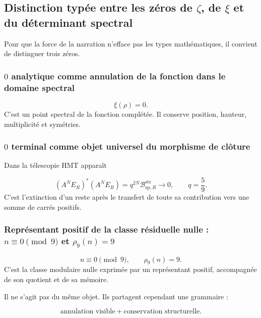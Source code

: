 \subsection{Distinction typée entre les zéros de \(\zeta\), de \(\xi\) et du déterminant spectral}
Pour que la force de la narration n'efface pas les types mathématiques, il convient de distinguer trois zéros.\par
{}
\subsubsection{\(0\) analytique comme annulation de la fonction dans le domaine spectral}
\[
\xi(\rho)=0.
\]
C'est un point spectral de la fonction complétée. Il conserve position, hauteur, multiplicité et symétries.\par
{}
\subsubsection{\(0\) terminal comme objet universel du morphisme de clôture}
Dans la télescopie HMT apparaît\par
\[
(A^NE_R)^*(A^NE_R)
=
q^{2N}
\mathcal B_{\mathrm{sp},R}^{\mathrm{str}}
\longrightarrow0,
\qquad
q=\frac59.
\]
C'est l'extinction d'un reste après le transfert de toute sa contribution vers une somme de carrés positifs.\par
{}
\subsubsection{Représentant positif de la classe résiduelle nulle : \(n\equiv0\pmod 9\) et \(\rho_9(n)=9\)}
\[
n\equiv0\pmod9,
\qquad
\rho_9(n)=9.
\]
C'est la classe modulaire nulle exprimée par un représentant positif, accompagnée de son quotient et de sa mémoire.\par
Il ne s'agit pas du même objet. Ils partagent cependant une grammaire :\par
\[
\text{annulation visible}
+
\text{conservation structurelle}.
\]
